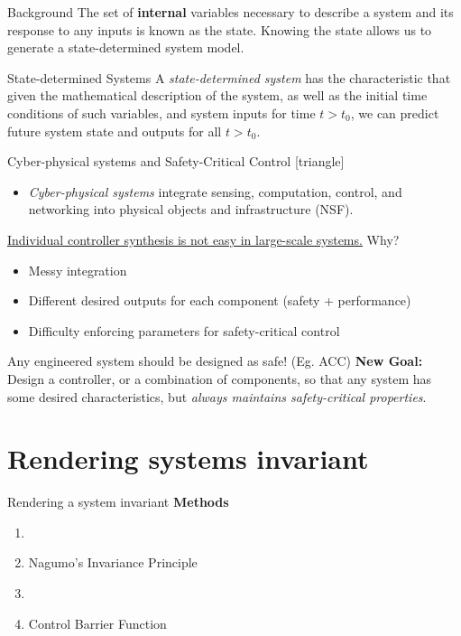 \documentclass[aspectratio=169,xcolor=dvipsnames]{beamer}
\begin{document}
\begin{frame}{Background}
    The set of \textbf{internal} variables necessary to describe a system and its response to any inputs is known as the  \alert{state}. Knowing the state allows us to generate a \alert{state-determined system} model. 
    \bigbreak
    \begin{block}{State-determined Systems}
        A \textit{state-determined system} has the characteristic that given the mathematical description of the system, as well as the initial time conditions of such variables, and system inputs for time $t > t_0$, we can predict future system state and outputs for all $t > t_0$. 
    \end{block}
\end{frame}


\begin{frame}{Cyber-physical systems and Safety-Critical Control}
    [triangle]
    \begin{itemize}
    \item \textit{Cyber-physical systems} integrate sensing, computation, control, and networking into physical objects and infrastructure (NSF).
    \end{itemize} 
    
    \underline{Individual controller synthesis is not easy in large-scale systems.}
    Why?
    \begin{itemize}
    \item Messy integration
    \item Different desired outputs for each component (safety + performance)
    \item Difficulty enforcing parameters for safety-critical control
    \end{itemize} 
    Any engineered system should be designed as safe! (Eg. ACC)
    \bigbreak
    \textbf{New Goal:} Design a controller, or a combination of components, so that any system has some desired characteristics, but \textit{always maintains safety-critical properties}.
\end{frame}
\section{Rendering systems invariant}
\begin{frame}{Rendering a system invariant}
        \textbf{Methods}
        \begin{enumerate}
            \item \color{ForestGreen}{Lyapunov Theory}
            \color{RawSienna}
            \item Nagumo's Invariance Principle
            \item \color{ForestGreen}{Control Lyapunov Function}
            \color{RawSienna}
            \item Control Barrier Function
        \end{enumerate}
\end{frame}
\end{document}
